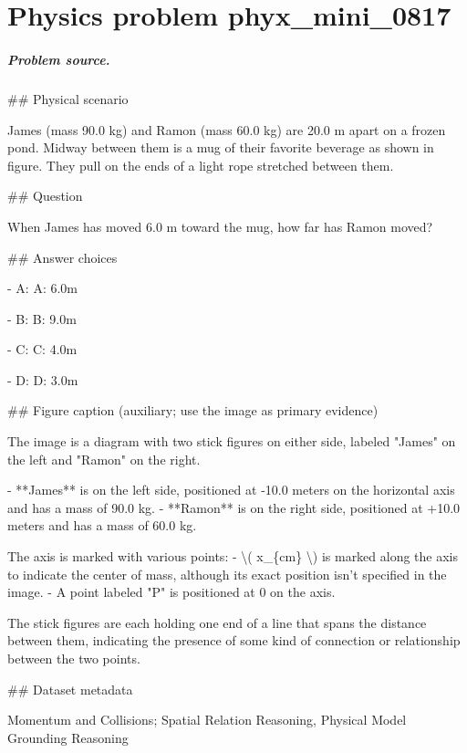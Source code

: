 
\chapter{Physics problem phyx\_mini\_0817}
\label{ch:PhyXMiniProblems_problem_phyx_mini_0817}

\paragraph{Problem source.}
\#\# Physical scenario

James (mass 90.0 kg) and Ramon (mass 60.0 kg) are 20.0 m apart on a frozen pond. Midway between them is a mug of their favorite beverage as shown in figure. They pull on the ends of a light rope stretched between them.

\#\# Question

When James has moved 6.0 m toward the mug, how far has Ramon moved?

\#\# Answer choices

- A: A: 6.0m

- B: B: 9.0m

- C: C: 4.0m

- D: D: 3.0m

\#\# Figure caption (auxiliary; use the image as primary evidence)

The image is a diagram with two stick figures on either side, labeled "James" on the left and "Ramon" on the right. 

- **James** is on the left side, positioned at -10.0 meters on the horizontal axis and has a mass of 90.0 kg.
- **Ramon** is on the right side, positioned at +10.0 meters and has a mass of 60.0 kg.
  
The axis is marked with various points:
- \textbackslash{}( x\_\{cm\} \textbackslash{}) is marked along the axis to indicate the center of mass, although its exact position isn't specified in the image.
- A point labeled "P" is positioned at 0 on the axis.

The stick figures are each holding one end of a line that spans the distance between them, indicating the presence of some kind of connection or relationship between the two points.

\#\# Dataset metadata

Momentum and Collisions; Spatial Relation Reasoning, Physical Model Grounding Reasoning

